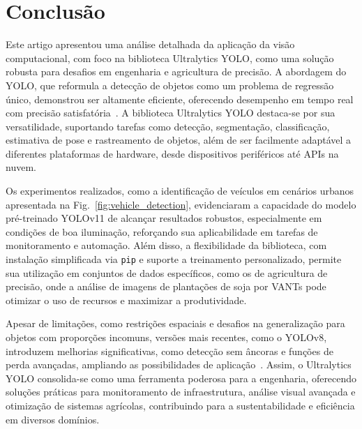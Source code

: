 \documentclass[journal,transmag]{IEEEtran}
\begin{document}
\section{Conclusão}

Este artigo apresentou uma análise detalhada da aplicação da visão computacional, com foco na biblioteca Ultralytics YOLO, como uma solução robusta para desafios em engenharia e agricultura de precisão. A abordagem do YOLO, que reformula a detecção de objetos como um problema de regressão único, demonstrou ser altamente eficiente, oferecendo desempenho em tempo real com precisão satisfatória~\cite{Redmon2015}. A biblioteca Ultralytics YOLO destaca-se por sua versatilidade, suportando tarefas como detecção, segmentação, classificação, estimativa de pose e rastreamento de objetos, além de ser facilmente adaptável a diferentes plataformas de hardware, desde dispositivos periféricos até APIs na nuvem.

Os experimentos realizados, como a identificação de veículos em cenários urbanos apresentada na Fig.~\ref{fig:vehicle_detection}, evidenciaram a capacidade do modelo pré-treinado YOLOv11 de alcançar resultados robustos, especialmente em condições de boa iluminação, reforçando sua aplicabilidade em tarefas de monitoramento e automação. Além disso, a flexibilidade da biblioteca, com instalação simplificada via \texttt{pip} e suporte a treinamento personalizado, permite sua utilização em conjuntos de dados específicos, como os de agricultura de precisão, onde a análise de imagens de plantações de soja por VANTs pode otimizar o uso de recursos e maximizar a produtividade.

Apesar de limitações, como restrições espaciais e desafios na generalização para objetos com proporções incomuns, versões mais recentes, como o YOLOv8, introduzem melhorias significativas, como detecção sem âncoras e funções de perda avançadas, ampliando as possibilidades de aplicação~\cite{Redmon2015}. Assim, o Ultralytics YOLO consolida-se como uma ferramenta poderosa para a engenharia, oferecendo soluções práticas para monitoramento de infraestrutura, análise visual avançada e otimização de sistemas agrícolas, contribuindo para a sustentabilidade e eficiência em diversos domínios.





\end{document}
